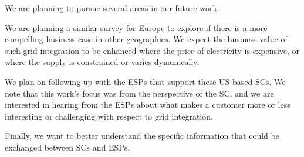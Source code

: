 We are planning to pursue several areas in our future work.

We are planning a similar survey for Europe to explore if there is a more compelling business case 
in other geographies.
We expect the business value of such grid integration to be enhanced where the price of 
electricity is expensive, or where the supply is constrained or varies dynamically.  

We plan on following-up with the ESPs that support these US-based SCs. We note that this work's 
focus was from the perspective of the SC, and 
we are interested in hearing from the ESPs about what makes a customer more or less interesting or 
challenging with respect to grid integration.

Finally, we want to better understand the specific information that could be exchanged between SCs and ESPs. 




